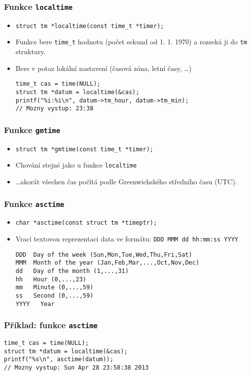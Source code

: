 \documentclass{beamer}
\newenvironment{itemizex}%
  {\large \begin{itemize}%
    \setlength{\itemsep}{8pt}%
    \setlength{\parskip}{8pt}}%
  {\end{itemize}}
\begin{document}
\begin{frame}[t,fragile]\frametitle{Funkce \texttt{localtime}} 
  \begin{itemizex}
    \item \texttt{struct tm *localtime(const time\_t *timer);}
    \item Funkce bere \texttt{time\_t} hodnotu (počet sekund od 1. 1. 1970) a rozseká ji do \texttt{tm} struktury. 
    \item Bere v potaz lokální nastavení (časová zóna, letní časy, \dots)
\begin{verbatim} 
time_t cas = time(NULL);
struct tm *datum = localtime(&cas);
printf("%i:%i\n", datum->tm_hour, datum->tm_min);
// Mozny vystup: 23:38
\end{verbatim}
  \end{itemizex}
\end{frame}


\begin{frame}[t,fragile]\frametitle{Funkce \texttt{gmtime}} 
  \begin{itemizex}
    \item \texttt{struct tm *gmtime(const time\_t *timer);}
    \item Chování stejné jako u funkce \texttt{localtime}
    \item \dots akorát všechen čas počítá podle Greenwichského středního času (UTC).
  \end{itemizex}
\end{frame}


\begin{frame}[t,fragile]\frametitle{Funkce \texttt{asctime}} 
  \begin{itemizex}
    \item \texttt{char *asctime(const struct tm *timeptr);}
    \item Vrací textovou reprezentaci data ve formátu: \texttt{DDD MMM dd hh:mm:ss YYYY}
\begin{verbatim} 
DDD  Day of the week (Sun,Mon,Tue,Wed,Thu,Fri,Sat)
MMM  Month of the year (Jan,Feb,Mar,...,Oct,Nov,Dec)
dd   Day of the month (1,...,31)
hh   Hour (0,...,23)
mm   Minute (0,...,59)
ss   Second (0,...,59)
YYYY   Year
\end{verbatim}
  \end{itemizex}
\end{frame}


\begin{frame}[t,fragile]\frametitle{Příklad: funkce \texttt{asctime}}
\begin{verbatim} 
time_t cas = time(NULL);
struct tm *datum = localtime(&cas);
printf("%s\n", asctime(datum));
// Mozny vystup: Sun Apr 28 23:58:38 2013
\end{verbatim}
\end{frame}
\end{document}
